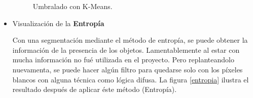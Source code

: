 \documentclass[a4paper, 11pt]{article}
\begin{document}
\begin{itemize}
  \begin{figure}[ht]%
    \centering
    \qquad
    \caption{Umbralado con K-Means.}%
    \label{kmeans}%
\end{figure}
  
\item Visualización de la \textbf{Entropía}

  Con una segmentación mediante el método de entropía, se puede obtener la información de la presencia de los objetos. Lamentablemente al estar con mucha información no fué utilizada en el proyecto. Pero replanteandolo nuevamenta, se puede hacer algún filtro para quedarse solo con los píxeles blancos con alguna técnica como lógica difusa. La figura \ref{entropia} ilustra el resultado después de aplicar éste método (Entropía).


\end{itemize}
\end{document}
